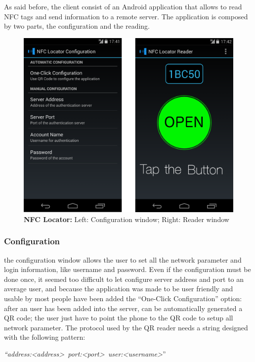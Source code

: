 \documentclass[conference]{IEEEtran}
\begin{document}
As said before, the client consist of an Android application that allows to read NFC tags and send information to a remote server.
The application is composed by two parts, the configuration and the reading.

\begin{figure}[h]
\centering
\includegraphics[scale=0.15]{fig2}
\caption{\textbf{NFC Locator: }Left: Configuration window; Right: Reader window}
\label{fig_sim}
\end{figure}

\subsubsection{Configuration}

the configuration window allows the user to set all the network parameter and login information, like username and password.
Even if the configuration must be done once, it seemed too difficult to let configure server address and port to an average user, and because the application was made to be user friendly and usable by most people have been added the “One-Click Configuration” option: after an user has been added into the server, can be automatically generated a QR code; the user just have to point the phone to the QR code to setup all network parameter. The protocol used by the QR reader needs a string designed with the following pattern:
\begin{center}
\textit{``address:\textless address\textgreater\ port:\textless port\textgreater\ user:\textless username\textgreater}''
\end{center}
\end{document}
